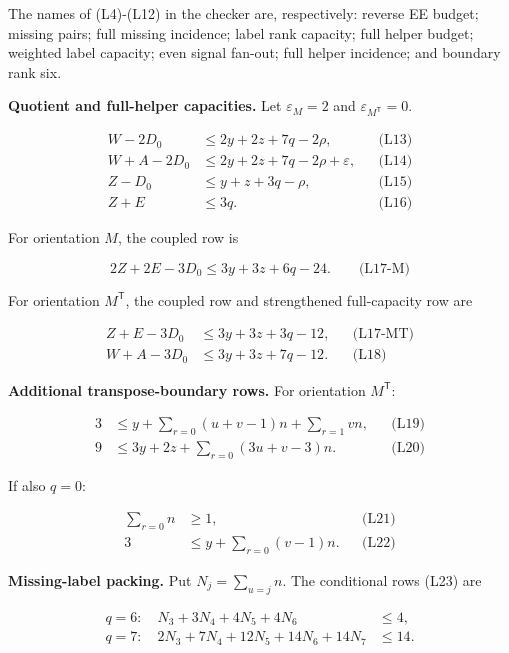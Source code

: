 The names of (L4)-(L12) in the checker are, respectively: reverse EE budget; missing pairs; full missing incidence; label rank capacity; full helper budget; weighted label capacity; even signal fan-out; full helper incidence; and boundary rank six.

\textbf{Quotient and full-helper capacities.} Let \(\varepsilon_M=2\) and \(\varepsilon_{M^{\mathsf T}}=0\).

\[
\begin{aligned}
W-2D_0&\le2y+2z+7q-2\rho,&&\text{(L13)}\\
W+A-2D_0&\le2y+2z+7q-2\rho+\varepsilon,&&\text{(L14)}\\
Z-D_0&\le y+z+3q-\rho,&&\text{(L15)}\\
Z+E&\le3q.&&\text{(L16)}
\end{aligned}
\]

For orientation \(M\), the coupled row is

\[
2Z+2E-3D_0\le3y+3z+6q-24.\qquad\text{(L17-M)}
\]

For orientation \(M^{\mathsf T}\), the coupled row and strengthened full-capacity row are

\[
\begin{aligned}
Z+E-3D_0&\le3y+3z+3q-12,&&\text{(L17-MT)}\\
W+A-3D_0&\le3y+3z+7q-12.&&\text{(L18)}
\end{aligned}
\]

\textbf{Additional transpose-boundary rows.} For orientation \(M^{\mathsf T}\):

\[
\begin{aligned}
3&\le y+\sum_{r=0}(u+v-1)n+\sum_{r=1}vn,&&\text{(L19)}\\
9&\le3y+2z+\sum_{r=0}(3u+v-3)n.&&\text{(L20)}
\end{aligned}
\]

If also \(q=0\):

\[
\begin{aligned}
\sum_{r=0}n&\ge1,&&\text{(L21)}\\
3&\le y+\sum_{r=0}(v-1)n.&&\text{(L22)}
\end{aligned}
\]

\textbf{Missing-label packing.} Put \(N_j=\sum_{u=j}n\). The conditional rows (L23) are

\[
\begin{aligned}
q=6:\quad N_3+3N_4+4N_5+4N_6&\le4,\\
q=7:\quad2N_3+7N_4+12N_5+14N_6+14N_7&\le14.
\end{aligned}
\]

